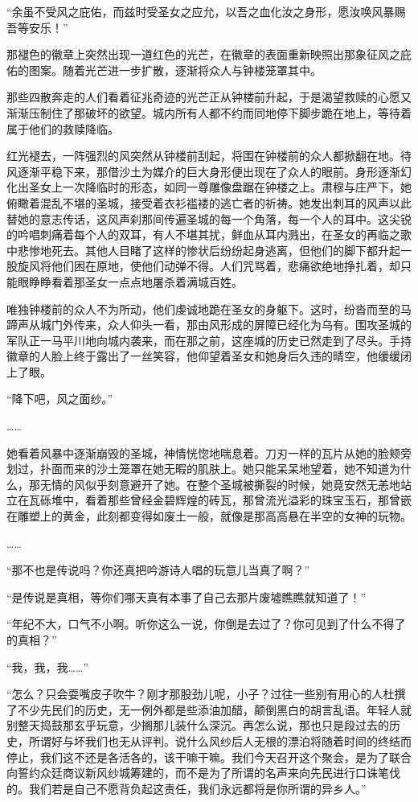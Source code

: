 “余虽不受风之庇佑，而兹时受圣女之应允，以吾之血化汝之身形，愿汝唤风暴赐吾等安乐！”

那褪色的徽章上突然出现一道红色的光芒，在徽章的表面重新映照出那象征风之庇佑的图案。随着光芒进一步扩散，逐渐将众人与钟楼笼罩其中。

那些四散奔走的人们看着征兆奇迹的光芒正从钟楼前升起，于是渴望救赎的心愿又渐渐压制住了那破坏的欲望。城内所有人都不约而同地停下脚步跪在地上，等待着属于他们的救赎降临。

红光褪去，一阵强烈的风突然从钟楼前刮起，将围在钟楼前的众人都掀翻在地。待风逐渐平稳下来，那借沙土为媒介的巨大身形便出现在了众人的眼前。身形逐渐幻化出圣女上一次降临时的形态，如同一尊雕像盘踞在钟楼之上。肃穆与庄严下，她俯瞰着混乱不堪的圣城，接受着衣衫褴褛的逃亡者的祈祷。她发出刺耳的风声以此替她的意志传话，这风声刹那间传遍圣城的每一个角落，每一个人的耳中。这尖锐的吟唱刺痛着每个人的双耳，有人不堪其扰，鲜血从耳内溅出，在圣女的再临之歌中悲惨地死去。其他人目睹了这样的惨状后纷纷起身逃离，但他们的脚下都升起一股旋风将他们困在原地，使他们动弹不得。人们咒骂着，悲痛欲绝地挣扎着，却只能眼睁睁看着那圣女一点点地屠杀着满城百姓。

唯独钟楼前的众人不为所动，他们虔诚地跪在圣女的身躯下。这时，纷沓而至的马蹄声从城门外传来，众人仰头一看，那由风形成的屏障已经化为乌有。围攻圣城的军队正一马平川地向城内袭来，而在那之前，这座城的历史已然走到了尽头。手持徽章的人脸上终于露出了一丝笑容，他仰望着圣女和她身后久违的晴空，他缓缓闭上了眼。

“降下吧，风之面纱。”

……

她看着风暴中逐渐崩毁的圣城，神情恍惚地喘息着。刀刃一样的瓦片从她的脸颊旁划过，扑面而来的沙土笼罩在她无暇的肌肤上。她只能呆呆地望着，她不知道为什么，那无情的风似乎刻意避开了她。在整个圣城被撕裂的时候，她竟安然无恙地站立在瓦砾堆中，看着那些曾经金碧辉煌的砖瓦，那曾流光溢彩的珠宝玉石，那曾嵌在雕塑上的黄金，此刻都变得如废土一般，就像是那高高悬在半空的女神的玩物。

……

“那不也是传说吗？你还真把吟游诗人唱的玩意儿当真了啊？”

“是传说是真相，等你们哪天真有本事了自己去那片废墟瞧瞧就知道了！”

“年纪不大，口气不小啊。听你这么一说，你倒是去过了？你可见到了什么不得了的真相？”

“我，我，我……”

“怎么？只会耍嘴皮子吹牛？刚才那股劲儿呢，小子？过往一些别有用心的人杜撰了不少先民们的历史，无一例外都是些添油加醋，颠倒黑白的胡言乱语。年轻人就别整天捣鼓那玄乎玩意，少搁那儿装什么深沉。再怎么说，那也只是段过去的历史，所谓好与坏我们也无从评判。说什么风纱后人无根的漂泊将随着时间的终结而停止，我们这不还是各活各的，该干嘛干嘛。我们今天召开这个聚会，是为了联合向誓约众廷商议新风纱城筹建的，而不是为了所谓的名声来向先民进行口诛笔伐的。我们若是自己不愿背负起这责任，我们永远都将是你所谓的异乡人。”

